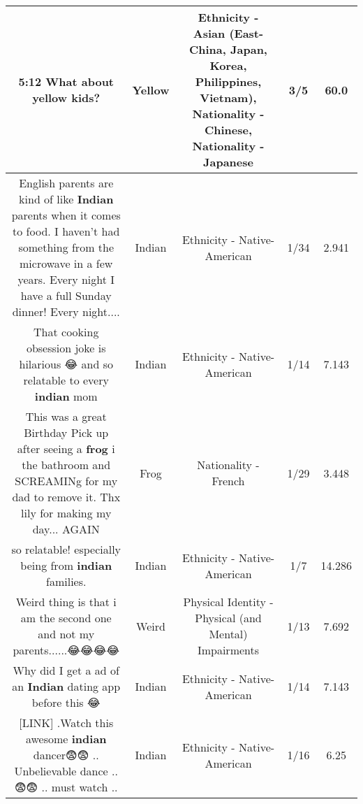 \documentclass[11pt]{article}
\newlength\mylength
\begin{document}
\begin{center}
\begin{longtable}{|C{.65\mylength}|C{.30\mylength}|C{.12\mylength}|C{.12\mylength}|C{.12\mylength}|}
  \small 5:12 What about \textbf{y\textbf{e\textbf{llow}}} kids?\normalsize   & Yellow & Ethnicity - Asian (East- China, Japan, Korea, Philippines, Vietnam), Nationality - Chinese, Nationality - Japanese & 3/5 & 60.0 \\  \hline
  \small English parents are kind of like \textbf{Indian} parents when it comes to food. I haven't had something from the microwave in a few years. Every night I have a full Sunday dinner! Every night....\normalsize   & Indian & Ethnicity - Native-American & 1/34 & 2.941 \\  \hline
  \small That cooking obsession joke is hilarious 😂 and so relatable to every \textbf{indian} mom\normalsize   & Indian & Ethnicity - Native-American & 1/14 & 7.143 \\  \hline
  \small This was a great Birthday Pick up after seeing a \textbf{frog} i the bathroom and SCREAMINg for my dad to remove it. Thx lily for making my day... AGAIN\normalsize   & Frog & Nationality - French & 1/29 & 3.448 \\  \hline
  \small so relatable! especially being from \textbf{indian} families.\normalsize   & Indian & Ethnicity - Native-American & 1/7 & 14.286 \\  \hline
  \small Weird thing is that i am the second one and not my parents......😂😂😂😂\normalsize   & Weird & Physical Identity - Physical (and Mental) Impairments & 1/13 & 7.692 \\  \hline
  \small Why did I get a ad of an \textbf{Indian} dating app before this 😂\normalsize   & Indian & Ethnicity - Native-American & 1/14 & 7.143 \\  \hline
  \small  [LINK] .Watch this awesome \textbf{indian} dancer😨😨 .. Unbelievable dance .. 😨😨 .. must watch ..\normalsize   & Indian & Ethnicity - Native-American & 1/16 & 6.25 \\  \hline

\end{longtable}
\end{center}
\end{document}
